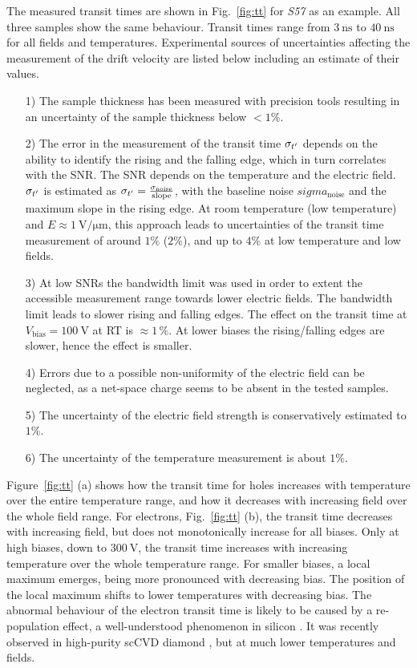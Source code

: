 The measured transit times are shown in Fig.~\ref{fig:tt} for \textit{S57} as an example. 
All three samples show the same behaviour. 
Transit times range from $\SI{3}{\nano\second}$ to $\SI{40}{\nano\second}$ for all fields and temperatures. 
Experimental sources of uncertainties affecting the measurement of the drift velocity are listed below including an estimate of their values.
\begin{itemize}
 \item[1)] The sample thickness has been measured with precision tools resulting in an uncertainty of the sample thickness below $<1\%$.
 \item[2)] The error in the measurement of the transit time $\sigma_{\mathnormal{t'}}$ depends on the ability to identify the rising and the falling edge, which in turn correlates with the SNR.
The SNR depends on the temperature and the electric field. 
$\sigma_{\mathnormal{t'}}$ is estimated as $\sigma_{\mathnormal{t'}} = \frac{\sigma_{\textrm{noise}}}{\textrm{slope}}$, with the baseline noise $sigma_{\textrm{noise}}$ and the maximum slope in the rising edge. 
At room temperature (low temperature) and $E\approx \SI{1}{\volt/\micro\meter}$, this approach leads to uncertainties of the transit time measurement of around $1\%$ ($2\%$),
 and up to $4\%$ at low temperature and low fields.
 \item[3)] At low SNRs the bandwidth limit was used in order to extent the accessible measurement range towards lower electric fields. 
The bandwidth limit leads to slower rising and falling edges. 
The effect on the transit time at $V_{\textrm{bias}} = \SI{100}{\volt}$ at RT is $\approx1\,\%$. 
At lower biases the rising/falling edges are slower, hence the effect is smaller. 
 \item[4)] Errors due to a possible non-uniformity of the electric field can be neglected, as a net-space charge seems to be absent in the tested samples.
 \item[5)] The uncertainty of the electric field strength is conservatively estimated to $1\%$.
 \item[6)] The uncertainty of the temperature measurement is about $1\%$. 
\end{itemize}




Figure~\ref{fig:tt} (a) shows how the transit time for holes increases with temperature over the entire temperature range,
 and how it decreases with increasing field over the whole field range. 
For electrons, Fig.~\ref{fig:tt} (b), the transit time decreases with increasing field, but does not monotonically increase for all biases. 
Only at high biases, down to $\SI{300}{\volt}$, the transit time increases with increasing temperature over the whole temperature range.
For smaller biases, a local maximum emerges, being more pronounced with decreasing bias.
The position of the local maximum shifts to lower temperatures with decreasing bias.
The abnormal behaviour of the electron transit time is likely to be caused by a re-population effect, a well-understood phenomenon in silicon \cite{Jacoboni197777}.
It was recently observed in high-purity scCVD diamond \cite{isberg:172103}, but at much lower temperatures and fields. 

 

